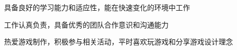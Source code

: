 \begin{pitem} %
	\item 具备良好的学习能力和适应性，能在快速变化的环境中工作 %
	\item 工作认真负责，具备优秀的团队合作意识和沟通能力 %
	\item 热爱游戏制作，积极参与相关活动，平时喜欢玩游戏和分享游戏设计理念 %
\end{pitem} %
